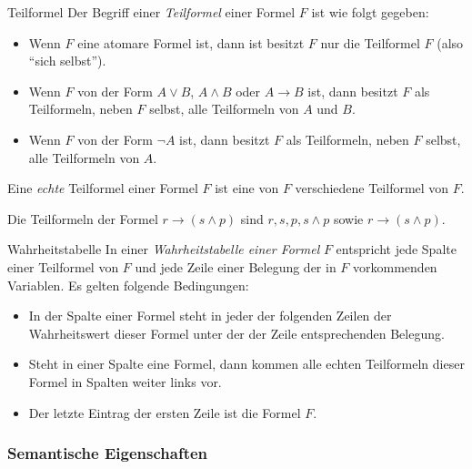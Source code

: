 \begin{definition}{Teilformel}
    Der Begriff einer \textit{Teilformel} einer Formel $F$ ist wie folgt gegeben:
    \begin{itemize}
        \item Wenn $F$ eine atomare Formel ist, dann ist besitzt $F$ nur die Teilformel $F$ (also ``sich selbst'').
        \item Wenn $F$ von der Form $A\lor B$, $A\land B$ oder $A\to B$ ist, dann besitzt $F$ als Teilformeln, neben $F$ selbst, alle Teilformeln von $A$ und $B$.
        \item Wenn $F$ von der Form $\neg A$ ist, dann besitzt $F$ als Teilformeln, neben $F$ selbst, alle Teilformeln von $A$.
    \end{itemize}
    Eine \textit{echte} Teilformel einer Formel $F$ ist eine von $F$ verschiedene Teilformel von $F$.
\end{definition}

\begin{example}
    Die Teilformeln der Formel $r\to (s\land p)$ sind $r,s,p,s\land p$ sowie $r\to (s\land p)$.
\end{example}

\begin{definition}{Wahrheitstabelle}
    In einer \textit{Wahrheitstabelle einer Formel} $F$ entspricht jede Spalte einer Teilformel von $F$ und jede Zeile einer Belegung der in $F$ vorkommenden Variablen. Es gelten folgende Bedingungen:
    \begin{itemize}
        \item In der Spalte einer Formel steht in jeder der folgenden Zeilen der Wahrheitswert dieser Formel unter der der Zeile entsprechenden Belegung.
        \item Steht in einer Spalte eine Formel, dann kommen alle echten Teilformeln dieser Formel in Spalten weiter links vor.
        \item Der letzte Eintrag der ersten Zeile ist die Formel $F$.
    \end{itemize}
\end{definition}



\subsubsection*{Semantische Eigenschaften}

